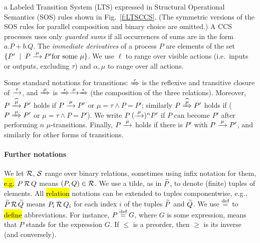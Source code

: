 a Labeled Transition System (LTS) expressed in Structural Operational
Semantics (SOS) rules shown in Fig.~\ref{f:LTSCCS}.
(The symmetric versions of the SOS rules for
parallel composition and binary choice are omitted.)
A CCS processes uses only \emph{guarded sums} if all occurrences of
sums are in the form $a.P + b.Q$. 
The \emph{immediate derivatives} of a
process $P$ are elements of the set $\{P' \st P \arr\mu P' \mbox{for some $\mu$}\}$.
We use $\ell$ to range over visible actions (i.e.~inputs or outputs, excluding  $\tau$)
and $\alpha, \mu$  to range over all actions.

Some standard notations for transitions: $\Arr\epsilon$ is the 
reflexive and transitive closure of $\arr\tau$, and 
$\Arr \mu $ is $\Arr\epsilon \arr\mu \Arr\epsilon$ (the
composition of the three relations).
Moreover,   
$P \arcap \mu P'$ holds if $P \arr\mu P'$ or $\mu =\tau \wedge P = P'$; similarly 
$P \Arcap \mu P'$ holds if ($P \Arr\mu P'$ or $\mu =\tau \wedge P = P'$).
We write $P \:(\arr\mu)^n P'$ if $P$ can become $P'$ after performing
$n$ $\mu$-transitions. Finally, $P \arr\mu$ holds if there is $P'$
with $P \arr\mu P'$, and similarly for other forms of transitions.

\paragraph{Further notations}
We let $\R$, $\S$ range over binary relations, sometimes using 
 infix notation for them, \hl{e.g.} $P \,\R\, Q$ means $(P,Q) \in \R$.
We use a tilde, as in  $\til P$, to denote (finite) tuples of elements. 
All \hl{relation} notations can be extended to tuples componentwise,
e.g., $\til P \,\R\, \til Q$ means $P_i \,\R\, Q_i$ for each index $i$ of the tuples $\til P$ and $\til Q$.
We use $\DSdefi$ to \hl{define} abbreviations. For instance, $P \DSdefi G $, where
$G$ is some expression, means that $P$ stands for the expression $G$.
If $\leq$ is a preorder, then  $\geq$  is its inverse (and
conversely).

